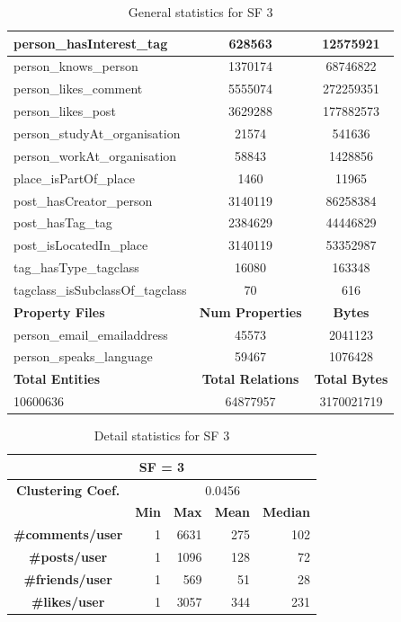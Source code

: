 \begin{table}[H]
\begin{tabular} {| l | c | c |}
        person\_hasInterest\_tag & 628563 & 12575921 \\
        \hline
        person\_knows\_person & 1370174 & 68746822 \\
        \hline
        person\_likes\_comment & 5555074 & 272259351 \\
        \hline
        person\_likes\_post & 3629288 & 177882573 \\
        \hline
        person\_studyAt\_organisation & 21574 & 541636 \\
        \hline
        person\_workAt\_organisation & 58843 & 1428856 \\
        \hline
        place\_isPartOf\_place & 1460 & 11965 \\
        \hline
        post\_hasCreator\_person & 3140119 & 86258384 \\
        \hline
        post\_hasTag\_tag & 2384629 & 44446829 \\
        \hline
        post\_isLocatedIn\_place & 3140119 & 53352987 \\
        \hline
        tag\_hasType\_tagclass & 16080 & 163348 \\
        \hline
        tagclass\_isSubclassOf\_tagclass & 70 & 616 \\
        \hline
        \hline
        \textbf{Property Files} & \textbf{Num Properties} & \textbf{Bytes} \\
        \hline
        \hline
        person\_email\_emailaddress & 45573 & 2041123 \\
        \hline
        person\_speaks\_language & 59467 & 1076428 \\
        \hline
        \hline
        \textbf{Total Entities} & \textbf{Total Relations} & \textbf{Total Bytes} \\
        \hline
        \hline
         10600636 & 64877957 & 3170021719 \\
        \hline
    \end{tabular}
    \caption{General statistics for SF 3}
\end{table}

\begin{table}[H]
    \centering
\begin{tabular}{|c||r|r|r|r|}
\hline    \multicolumn{5}{|c|}{SF = 3 }  \\
\hline   \textbf{Clustering Coef.} &   \multicolumn{4}{|c|}{0.0456} \\
\hline & \textbf{Min} & \textbf{Max} & \textbf{Mean} & \textbf{Median}   \\
\hline  \textbf{\#comments/user}  &1 &  6631 & 275 & 102 \\
\hline  \textbf{\#posts/user}  &1 &  1096 & 128 & 72 \\
\hline  \textbf{\#friends/user}  &1 &  569 & 51 & 28 \\
\hline  \textbf{\#likes/user}  &1 &  3057 & 344 & 231 \\
\hline
\end{tabular}
\caption{Detail statistics for SF 3}
\end{table}

